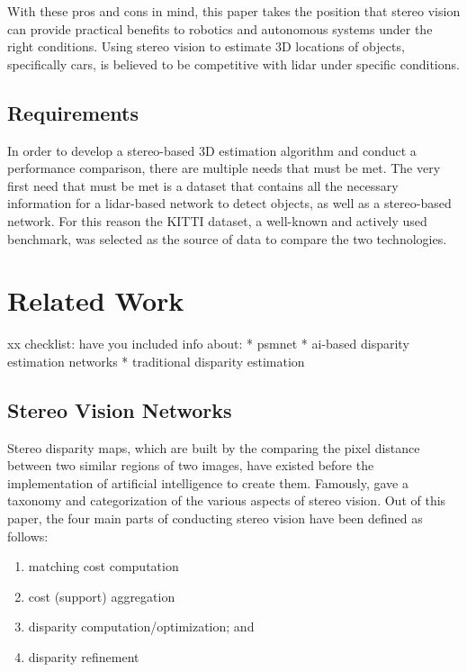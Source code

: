 With these pros and cons in mind, this paper takes the position that stereo vision can provide practical benefits to robotics and autonomous systems under the right conditions. Using stereo vision to estimate 3D locations of objects, specifically cars, is believed to be competitive with lidar under specific conditions.


\subsection{Requirements}
In order to develop a stereo-based 3D estimation algorithm and conduct a performance comparison, there are multiple needs that must be met. The very first need that must be met is a dataset that contains all the necessary information for a lidar-based network to detect objects, as well as a stereo-based network. For this reason the KITTI dataset, a well-known and actively used benchmark, was selected as the source of data to compare the two technologies.

\section{Related Work}

xx checklist: have you included info about: 
* psmnet
* ai-based disparity estimation networks
* traditional disparity estimation


\subsection{Stereo Vision Networks}
Stereo disparity maps, which are built by the comparing the pixel distance between two similar regions of two images, have existed before the implementation of artificial intelligence to create them. Famously, \cite{scharstein_taxonomy_2002} gave a taxonomy and categorization of the various aspects of stereo vision. Out of this paper, the four main parts of conducting stereo vision have been defined as follows:

\begin{enumerate} \itemsep=-0.5em
    \item matching cost computation
    \item cost (support) aggregation
    \item disparity computation/optimization; and
    \item disparity refinement
\end{enumerate}


